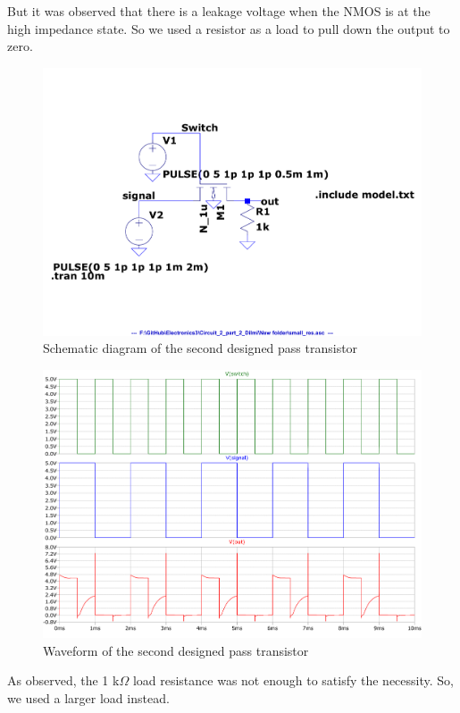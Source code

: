 \documentclass[a4paper,11pt]{article}%
\begin{document}
But it was observed that there is a leakage voltage when the NMOS is at the high impedance state. So we used a resistor as a load to pull down the output to zero.

\begin{figure}[H]
	\centering
	\includegraphics[scale=0.4]{figures/2part2/small_res_cct.pdf}
	\caption{Schematic diagram of the second designed pass transistor}
\end{figure}
\begin{figure}[H]
	\centering
	\includegraphics[scale=0.5]{figures/2part2/without_res_wave.pdf}
	\caption{Waveform of the second designed pass transistor}
\end{figure}

As observed, the 1 k$\Omega$ load resistance was not enough to satisfy the necessity. So, we used a larger load instead.
\end{document}
